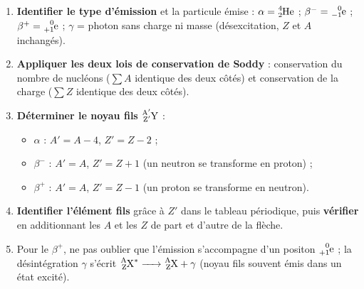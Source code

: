 \documentclass[11pt]{article}
\begin{document}
\begin{methode}
\begin{enumerate}
\item \textbf{Identifier le type d'émission} et la particule émise : $\alpha = \ce{^{4}_{2}He}$ ; $\beta^- = \ce{^{0}_{-1}e}$ ; $\beta^+ = \ce{^{0}_{+1}e}$ ; $\gamma$ = photon sans charge ni masse (désexcitation, $Z$ et $A$ inchangés).
\item \textbf{Appliquer les deux lois de conservation de Soddy} : conservation du nombre de nucléons ($\sum A$ identique des deux côtés) et conservation de la charge ($\sum Z$ identique des deux côtés).
\item \textbf{Déterminer le noyau fils} $\ce{^{A'}_{Z'}Y}$ :
\begin{itemize}
\item $\alpha$ : $A' = A - 4$, $Z' = Z - 2$ ;
\item $\beta^-$ : $A' = A$, $Z' = Z + 1$ (un neutron se transforme en proton) ;
\item $\beta^+$ : $A' = A$, $Z' = Z - 1$ (un proton se transforme en neutron).
\end{itemize}
\item \textbf{Identifier l'élément fils} grâce à $Z'$ dans le tableau périodique, puis \textbf{vérifier} en additionnant les $A$ et les $Z$ de part et d'autre de la flèche.
\item Pour le $\beta^+$, ne pas oublier que l'émission s'accompagne d'un positon $\ce{^{0}_{+1}e}$ ; la désintégration $\gamma$ s'écrit $\ce{^{A}_{Z}X^{*} -> ^{A}_{Z}X + \gamma}$ (noyau fils souvent émis dans un état excité).
\end{enumerate}
\end{methode}
\end{document}
